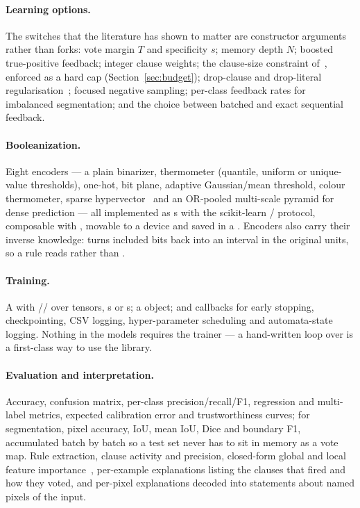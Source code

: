\paragraph{Learning options.}
The switches that the literature has shown to matter are constructor arguments rather than
forks: vote margin $T$ and specificity $s$; memory depth $N$; boosted true-positive feedback;
integer clause weights; the clause-size constraint of~, enforced as a hard cap
(Section~\ref{sec:budget}); drop-clause and drop-literal regularisation~; focused
negative sampling; per-class feedback rates for imbalanced segmentation; and the choice
between batched and exact sequential feedback.

\paragraph{Booleanization.}
Eight encoders --- a plain binarizer, thermometer (quantile, uniform or unique-value
thresholds), one-hot, bit plane, adaptive Gaussian\slash mean threshold, colour thermometer,
sparse hypervector~ and an OR-pooled multi-scale pyramid for dense prediction ---
all implemented as s with the scikit-learn
\slash{} protocol, composable with , movable to a
device and saved in a . Encoders also carry their inverse knowledge:
 turns included bits back into an interval in the
original units, so a rule reads  rather than
.

\paragraph{Training.}
A  with \slash{}\slash{} over tensors,
s or s; a  object; and callbacks for early
stopping, checkpointing, CSV logging, hyper-parameter scheduling and automata-state logging.
Nothing in the models requires the trainer --- a hand-written loop over 
is a first-class way to use the library.

\paragraph{Evaluation and interpretation.}
Accuracy, confusion matrix, per-class precision\slash recall\slash F1, regression and
multi-label metrics, expected calibration error and trustworthiness curves; for segmentation,
pixel accuracy, IoU, mean IoU, Dice and boundary F1, accumulated batch by batch so a test set
never has to sit in memory as a vote map. Rule extraction, clause activity and precision,
closed-form global and local feature importance~, per-example explanations listing
the clauses that fired and how they voted, and per-pixel explanations decoded into statements
about named pixels of the input.

